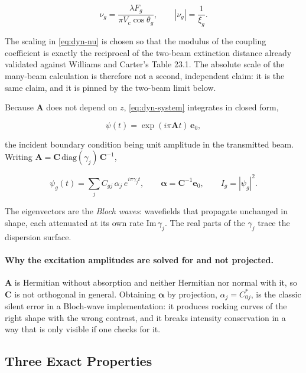 \begin{equation}
  \nu_{g} = \frac{\lambda F_{g}}{\pi V_{c}\cos\theta_{g}},
  \qquad |\nu_{g}| = \frac{1}{\xi_{g}} .
  \label{eq:dyn-nu}
\end{equation}

The scaling in \eqref{eq:dyn-nu} is chosen so that the modulus of the coupling coefficient is
exactly the reciprocal of the two-beam extinction distance already validated against Williams
and Carter's Table 23.1. The absolute scale of the many-beam calculation is therefore not a
second, independent claim: it is the same claim, and it is pinned by the two-beam limit below.

Because \(\mathbf{A}\) does not depend on \(z\), \eqref{eq:dyn-system} integrates in closed
form,

\begin{equation}
  \psi(t) = \exp(i\pi\mathbf{A}t)\,\mathbf{e}_{0},
  \label{eq:dyn-propagator}
\end{equation}

the incident boundary condition being unit amplitude in the transmitted beam. Writing
\(\mathbf{A} = \mathbf{C}\,\mathrm{diag}(\gamma_{j})\,\mathbf{C}^{-1}\),

\begin{equation}
  \psi_{g}(t) = \sum_{j} C_{gj}\,\alpha_{j}\,e^{i\pi\gamma_{j}t},
  \qquad
  \boldsymbol{\alpha} = \mathbf{C}^{-1}\mathbf{e}_{0},
  \qquad
  I_{g} = |\psi_{g}|^{2}.
  \label{eq:dyn-bloch}
\end{equation}

The eigenvectors are the \emph{Bloch waves}: wavefields that propagate unchanged in shape,
each attenuated at its own rate \(\mathrm{Im}\,\gamma_{j}\). The real parts of the
\(\gamma_{j}\) trace the dispersion surface.

\paragraph{Why the excitation amplitudes are solved for and not projected.} \(\mathbf{A}\) is
Hermitian without absorption and neither Hermitian nor normal with it, so \(\mathbf{C}\) is
not orthogonal in general. Obtaining \(\boldsymbol{\alpha}\) by projection, \(\alpha_{j} =
C_{0j}^{*}\), is the classic silent error in a Bloch-wave implementation: it produces
rocking curves of the right shape with the wrong contrast, and it breaks intensity
conservation in a way that is only visible if one checks for it.

\subsection{Three Exact Properties}

